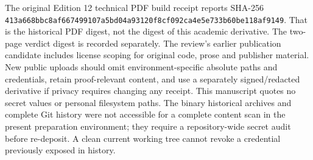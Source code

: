 \documentclass[11pt,letterpaper]{article}
\theoremstyle{definition}\newtheorem{definition}[theorem]{Definition}\newtheorem{example}[theorem]{Example}
\theoremstyle{remark}\newtheorem{remark}[theorem]{Remark}
\begin{document}
The original Edition 12 technical PDF build receipt reports SHA-256 \nolinkurl{413a668bbc8af667499107a5bd04a93120f8cf092ca4e5e733b60be118af9149}. That is the historical PDF digest, not the digest of this academic derivative. The two-page verdict digest is recorded separately. The review's earlier publication candidate includes license scoping for original code, prose and publisher material. New public uploads should omit environment-specific absolute paths and credentials, retain proof-relevant content, and use a separately signed/redacted derivative if privacy requires changing any receipt. This manuscript quotes no secret values or personal filesystem paths. The binary historical archives and complete Git history were not accessible for a complete content scan in the present preparation environment; they require a repository-wide secret audit before re-deposit. A clean current working tree cannot revoke a credential previously exposed in history.
\end{document}
